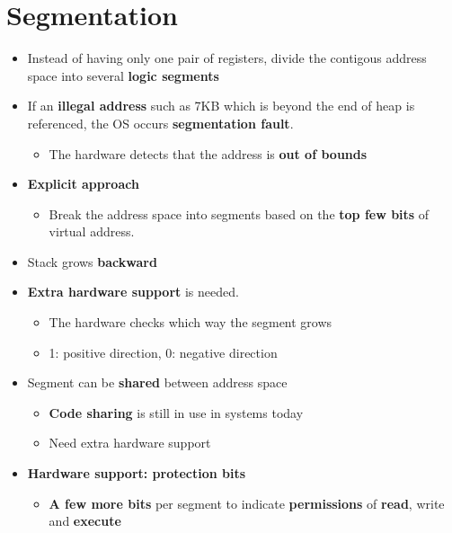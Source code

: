 \documentclass[a4paper,11pt,english]{article}
\begin{document}
\section*{Segmentation}
\begin{itemize}
    \item Instead of having only one pair of registers, divide the contigous address space into several \textbf{\color{blue} logic segments}
    \item If an \textbf{\color{red} illegal address} such as 7KB which is beyond the end of heap is referenced, the OS occurs \textbf{\color{red} segmentation fault}.
        \begin{itemize}
            \item The hardware detects that the address is \textbf{\color{red} out of bounds}
        \end{itemize}
    \item \textbf{Explicit approach}
        \begin{itemize}
            \item Break the address space into segments based on the \textbf{\color{blue} top few bits} of virtual address.
        \end{itemize}
    \item Stack grows \textbf{\color{blue} backward}
    \item \textbf{\color{blue} Extra hardware support} is needed.
        \begin{itemize}
            \item The hardware checks which way the segment grows
            \item 1: positive direction, 0: negative direction
        \end{itemize}
    \item Segment can be \textbf{\color{blue} shared} between address space
        \begin{itemize}
            \item \textbf{\color{blue} Code sharing} is still in use in systems today
            \item Need extra hardware support
        \end{itemize}
    \item \textbf{Hardware support: protection bits}
        \begin{itemize}
            \item \textbf{A few more bits} per segment to indicate \textbf{permissions} of \textbf{read}, write and \textbf{execute}
        \end{itemize}
\end{itemize}
\end{document}

